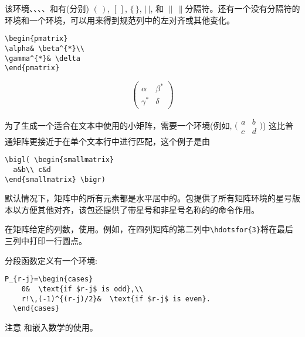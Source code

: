 该环境、、、、和有(分别) $(\,)$, $[\,]$,
$\lbrace\,\rbrace$, $\lvert\,\rvert$, 和 $\lVert\,\rVert$分隔符。还有一个没有分隔符的环境和一个环境，可以用来得到规范列中的左对齐或其他变化。

\begin{center}
\begin{minipage}{.4\columnwidth}
\begin{verbatim}
\begin{pmatrix}
\alpha& \beta^{*}\\
\gamma^{*}& \delta
\end{pmatrix}
\end{verbatim}
\end{minipage}
\qquad
\begin{minipage}{.4\columnwidth}
\[
\begin{pmatrix}
\alpha& \beta^{*}\\
\gamma^{*}& \delta
\end{pmatrix}
\]
\end{minipage}
\end{center}
为了生成一个适合在文本中使用的小矩阵，需要一个环境(例如,
\begin{math}
\bigl( \begin{smallmatrix}
  a&b\\ c&d
\end{smallmatrix} \bigr)
\end{math})
这比普通矩阵更接近于在单个文本行中进行匹配，这个例子是由
\begin{verbatim}
\bigl( \begin{smallmatrix}
  a&b\\ c&d
\end{smallmatrix} \bigr)
\end{verbatim}

默认情况下，矩阵中的所有元素都是水平居中的。包提供了所有矩阵环境的星号版本以方便其他对齐，该包还提供了带星号和非星号名称的的命令作用。

在矩阵给定的列数，使用。例如，在四列矩阵的第二列中\verb'\hdotsfor{3}'将在最后三列中打印一行圆点。

分段函数定义有一个环境:

\begin{verbatim}
P_{r-j}=\begin{cases}
    0&  \text{if $r-j$ is odd},\\
    r!\,(-1)^{(r-j)/2}&  \text{if $r-j$ is even}.
  \end{cases}
\end{verbatim}
注意 和嵌入数学的使用。

